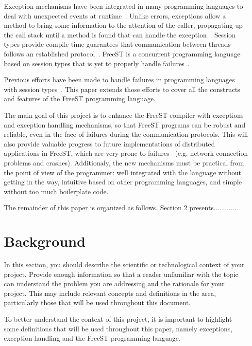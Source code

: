 \documentclass[sigplan]{acmart}
\begin{document}
Exception mechanisms have been integrated in many programming languages to deal with unexpected events at runtime~\cite{eh}.
Unlike errors, exceptions allow a method to bring some information to the attention of the caller, propagating up the call stack until a method is found that can handle the exception~\cite{javabook}.
Session types provide compile-time guarantees that communication between threads follows an established protocol~\cite{exceptionssessiontypes}.
FreeST is a concurrent programming language based on session types that is yet to properly handle failures~\cite{freest}.

Previous efforts have been made to handle failures in programming languages with session types~\cite{exceptionssessiontypes}.
This paper extends those efforts to cover all the constructs and features of the FreeST programming language.

The main goal of this project is to enhance the FreeST compiler with exceptions and exception handling mechanisms, so that FreeST programs can be robust and reliable, even in the face of failures during the communication protocols.
This will also provide valuable progress to future implementations of distributed applications in FreeST, which are very prone to failures~\cite{eh,exceptionssessiontypes} (e.g. network connection problems and crashes).
Additionaly, the new mechanisms must be practical from the point of view of the programmer: well integrated with the language without getting in the way, intuitive based on other programming languages, and simple without too much boilerplate code.

The remainder of this paper is organized as follows.
Section 2 presents..............

\section{Background} \label{sec:background}

\begin{template}
  In this section, you should describe the scientific or technological context of your project. Provide enough information so that a reader unfamiliar with the topic can understand the problem you are addressing and the rationale for your project. This may include relevant concepts and definitions in the area, particularly those that will be used throughout this document.
\end{template}

To better understand the context of this project, it is important to highlight some definitions that will be used throughout this paper, namely exceptions, exception handling and the FreeST programming language.
\end{document}
